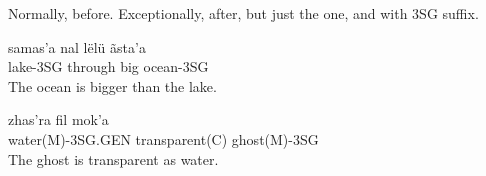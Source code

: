 
Normally, before. Exceptionally, after, but just the one, and with 3SG suffix.


\begin{exe}
\ex\label{exe:comparatives-more}
\gll samas’a nal lëlü ãsta’a\\
lake-3SG through big ocean-3SG\\
\trans The ocean is bigger than the lake.
\end{exe}

\begin{exe}
\ex\label{exe:comparatives-equal}
\gll zhas’ra fil mok’a\\
water(M)-3SG.GEN transparent(C) ghost(M)-3SG\\
\trans The ghost is transparent as water.
\end{exe}

